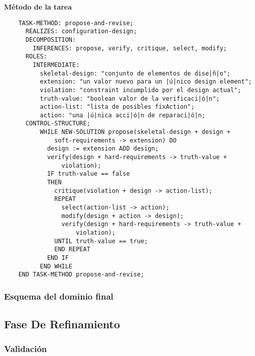 \documentclass[12pt,a4paper,twoside,spanish]{article}      %
\begin{document}
\textbf {Método de la tarea}
\begin{lstlisting}
    TASK-METHOD: propose-and-revise;
      REALIZES: configuration-design;
      DECOMPOSITION:
        INFERENCES: propose, verify, critique, select, modify;
      ROLES:
        INTERMEDIATE:
          skeletal-design: "conjunto de elementos de dise|ñ|o";
          extension: "un valor nuevo para un |ú|nico design element";
          violation: "constraint incumplido por el design actual";
          truth-value: "boolean valor de la verificaci|ó|n";
          action-list: "lista de posibles fixAction";
          action: "una |ú|nica acci|ó|n de reparaci|ó|n;
      CONTROL-STRUCTURE;
          WHILE NEW-SOLUTION propose(skeletal-design + design +
              soft-requirements -> extension) DO
            design := extension ADD design;
            verify(design + hard-requirements -> truth-value +
                violation);
            IF truth-value == false
            THEN
              critique(violation + design -> action-list);
              REPEAT
                select(action-list -> action);
                modify(design + action -> design);
                verify(design + hard-requirements -> truth-value +
                    violation);
              UNTIL truth-value == true;
              END REPEAT
            END IF
          END WHILE
    END TASK-METHOD propose-and-revise;
\end{lstlisting}

\subsubsection{Esquema del dominio final}

\subsection{Fase De Refinamiento}


\subsubsection{Validación}
\end{document}
